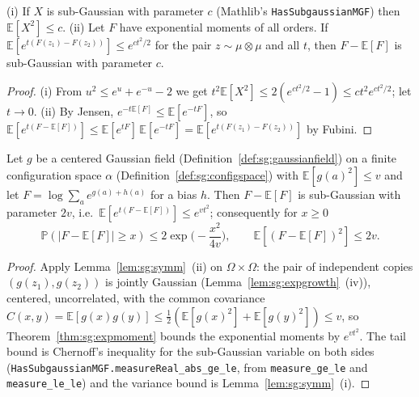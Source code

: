 \begin{lemma}\label{lem:sg:symm}
  \leanok
(i) If $X$ is sub-Gaussian with parameter $c$ (Mathlib's \texttt{HasSubgaussianMGF}) then $\mathbb E[X^2]\le c$. (ii) Let $F$ have exponential moments of
all orders. If $\mathbb E[e^{t(F(z_1)-F(z_2))}]\le e^{ct^2/2}$ for the pair $z\sim\mu\otimes\mu$ and all $t$, then $F-\mathbb E[F]$ is sub-Gaussian with parameter $c$.
\end{lemma}

\begin{proof}
  \leanok
(i) From $u^2\le e^u+e^{-u}-2$ we get $t^2\mathbb E[X^2]\le2(e^{ct^2/2}-1)\le ct^2e^{ct^2/2}$; let $t\to0$. (ii) By Jensen, $e^{-t\mathbb E[F]}\le\mathbb E[e^{-tF}]$, so
$\mathbb E[e^{t(F-\mathbb E[F])}]\le\mathbb E[e^{tF}]\,\mathbb E[e^{-tF}]=\mathbb E[e^{t(F(z_1)-F(z_2))}]$ by Fubini.
\end{proof}

\begin{theorem}\label{thm:sg:fecentration}
  \leanok
Let $g$ be a centered Gaussian field (Definition~\ref{def:sg:gaussianfield}) on a finite configuration space $\alpha$ (Definition~\ref{def:sg:configspace}) with $\mathbb E[g(a)^2]\le v$ and let $F=\log\sum_ae^{g(a)+h(a)}$ for a bias $h$.
Then $F-\mathbb E[F]$ is sub-Gaussian with parameter $2v$, i.e.\ $\mathbb E[e^{t(F-\mathbb E[F])}]\le e^{vt^2}$; consequently for $x\ge0$
\[\mathbb P(|F-\mathbb E[F]|\ge x)\le2\exp\Big(-\frac{x^2}{4v}\Big),\qquad\mathbb E[(F-\mathbb E[F])^2]\le2v.\]
\end{theorem}

\begin{proof}
  \leanok
Apply Lemma~\ref{lem:sg:symm}~(ii) on $\Omega\times\Omega$: the pair of independent copies $(g(z_1),g(z_2))$ is jointly Gaussian
(Lemma~\ref{lem:sg:expgrowth}~(iv)), centered, uncorrelated, with the common covariance $C(x,y)=\mathbb E[g(x)g(y)]\le\frac12(\mathbb E[g(x)^2]+\mathbb E[g(y)^2])\le v$,
so Theorem~\ref{thm:sg:expmoment} bounds the exponential moments by $e^{vt^2}$. The tail bound is Chernoff's inequality for the sub-Gaussian variable on both
sides (\texttt{HasSubgaussianMGF.measureReal\_abs\_ge\_le}, from \texttt{measure\_ge\_le} and \texttt{measure\_le\_le}) and the variance bound is Lemma~\ref{lem:sg:symm}~(i).
\end{proof}

